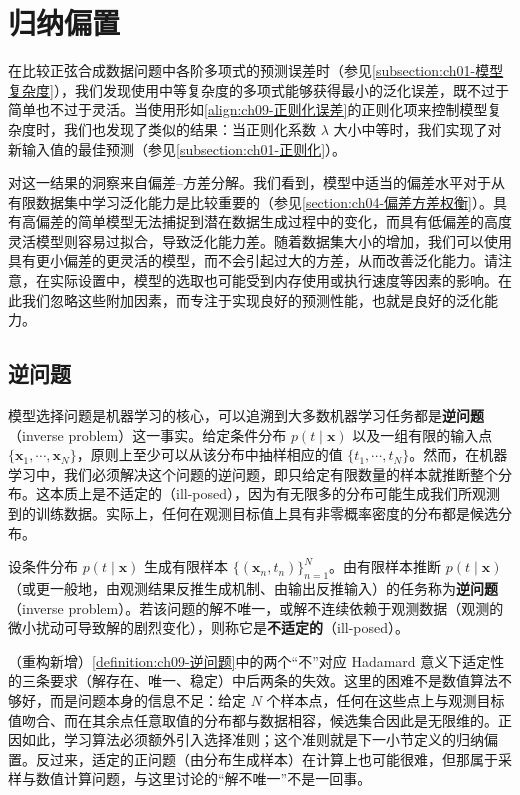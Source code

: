 \documentclass[../../main.tex]{subfiles}
\begin{document}
\section{归纳偏置}\label{section:ch09-归纳偏置}

在比较正弦合成数据问题中各阶多项式的预测误差时（参见\cref{subsection:ch01-模型复杂度}），我们发现使用中等复杂度的多项式能够获得最小的泛化误差，既不过于简单也不过于灵活。当使用形如\eqref{align:ch09-正则化误差}的正则化项来控制模型复杂度时，我们也发现了类似的结果：当正则化系数 $\lambda$ 大小中等时，我们实现了对新输入值的最佳预测（参见\cref{subsection:ch01-正则化}）。

对这一结果的洞察来自偏差--方差分解。我们看到，模型中适当的偏差水平对于从有限数据集中学习泛化能力是比较重要的（参见\cref{section:ch04-偏差方差权衡}）。具有高偏差的简单模型无法捕捉到潜在数据生成过程中的变化，而具有低偏差的高度灵活模型则容易过拟合，导致泛化能力差。随着数据集大小的增加，我们可以使用具有更小偏差的更灵活的模型，而不会引起过大的方差，从而改善泛化能力。请注意，在实际设置中，模型的选取也可能受到内存使用或执行速度等因素的影响。在此我们忽略这些附加因素，而专注于实现良好的预测性能，也就是良好的泛化能力。

\subsection{逆问题}\label{subsection:ch09-逆问题}

模型选择问题是机器学习的核心，可以追溯到大多数机器学习任务都是\textbf{逆问题}（inverse problem）这一事实。给定条件分布 $p(t\mid\boldsymbol{x})$ 以及一组有限的输入点 $\{\boldsymbol{x}_{1},\cdots,\boldsymbol{x}_{N}\}$，原则上至少可以从该分布中抽样相应的值 $\{t_{1},\cdots,t_{N}\}$。然而，在机器学习中，我们必须解决这个问题的逆问题，即只给定有限数量的样本就推断整个分布。这本质上是不适定的（ill-posed），因为有无限多的分布可能生成我们所观测到的训练数据。实际上，任何在观测目标值上具有非零概率密度的分布都是候选分布。

\begin{definition}[逆问题与不适定性]\label{definition:ch09-逆问题}
设条件分布 $p(t\mid\boldsymbol{x})$ 生成有限样本 $\{(\boldsymbol{x}_{n},t_{n})\}_{n=1}^{N}$。由有限样本推断 $p(t\mid\boldsymbol{x})$（或更一般地，由观测结果反推生成机制、由输出反推输入）的任务称为\textbf{逆问题}（inverse problem）。若该问题的解不唯一，或解不连续依赖于观测数据（观测的微小扰动可导致解的剧烈变化），则称它是\textbf{不适定的}（ill-posed）。
\end{definition}

\begin{remark}（重构新增）\cref{definition:ch09-逆问题}中的两个“不”对应 Hadamard 意义下适定性的三条要求（解存在、唯一、稳定）中后两条的失效。这里的困难不是数值算法不够好，而是问题本身的信息不足：给定 $N$ 个样本点，任何在这些点上与观测目标值吻合、而在其余点任意取值的分布都与数据相容，候选集合因此是无限维的。正因如此，学习算法必须额外引入选择准则；这个准则就是下一小节定义的归纳偏置。反过来，适定的正问题（由分布生成样本）在计算上也可能很难，但那属于采样与数值计算问题，与这里讨论的“解不唯一”不是一回事。
\end{remark}
\end{document}
